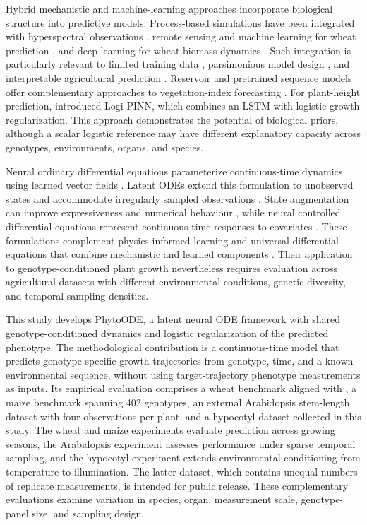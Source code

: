 \documentclass[preprint,12pt,authoryear]{elsarticle}
\newcommand{\model}{PhytoODE}
\begin{document}
Hybrid mechanistic and machine-learning approaches incorporate biological structure into predictive models. Process-based simulations have been integrated with hyperspectral observations \citep{wang2025gecros}, remote sensing and machine learning for wheat prediction \citep{kheir2025hybrid}, and deep learning for wheat biomass dynamics \citep{chen2026biomass}. Such integration is particularly relevant to limited training data \citep{dhal2022aquaponic}, parsimonious model design \citep{saravi2021variable}, and interpretable agricultural prediction \citep{ryo2022xai,ennaji2023nutrient}. Reservoir and pretrained sequence models offer complementary approaches to vegetation-index forecasting \citep{olamofe2025ndvi}. For plant-height prediction, \citet{shao2026pinn} introduced Logi-PINN, which combines an LSTM with logistic growth regularization. This approach demonstrates the potential of biological priors, although a scalar logistic reference may have different explanatory capacity across genotypes, environments, organs, and species.

Neural ordinary differential equations parameterize continuous-time dynamics using learned vector fields \citep{chen2018neuralode}. Latent ODEs extend this formulation to unobserved states and accommodate irregularly sampled observations \citep{rubanova2019latentode}. State augmentation can improve expressiveness and numerical behaviour \citep{dupont2019augmented}, while neural controlled differential equations represent continuous-time responses to covariates \citep{kidger2020neuralcde}. These formulations complement physics-informed learning \citep{raissi2019pinn,karniadakis2021piml} and universal differential equations that combine mechanistic and learned components \citep{rackauckas2020ude}. Their application to genotype-conditioned plant growth nevertheless requires evaluation across agricultural datasets with different environmental conditions, genetic diversity, and temporal sampling densities.

This study develops \model{}, a latent neural ODE framework with shared genotype-conditioned dynamics and logistic regularization of the predicted phenotype. The methodological contribution is a continuous-time model that predicts genotype-specific growth trajectories from genotype, time, and a known environmental sequence, without using target-trajectory phenotype measurements as inputs. Its empirical evaluation comprises a wheat benchmark aligned with \citet{shao2026pinn}, a maize benchmark spanning 402 genotypes, an external Arabidopsis stem-length dataset with four observations per plant, and a hypocotyl dataset collected in this study. The wheat and maize experiments evaluate prediction across growing seasons, the Arabidopsis experiment assesses performance under sparse temporal sampling, and the hypocotyl experiment extends environmental conditioning from temperature to illumination. The latter dataset, which contains unequal numbers of replicate measurements, is intended for public release. These complementary evaluations examine variation in species, organ, measurement scale, genotype-panel size, and sampling design.
\end{document}
